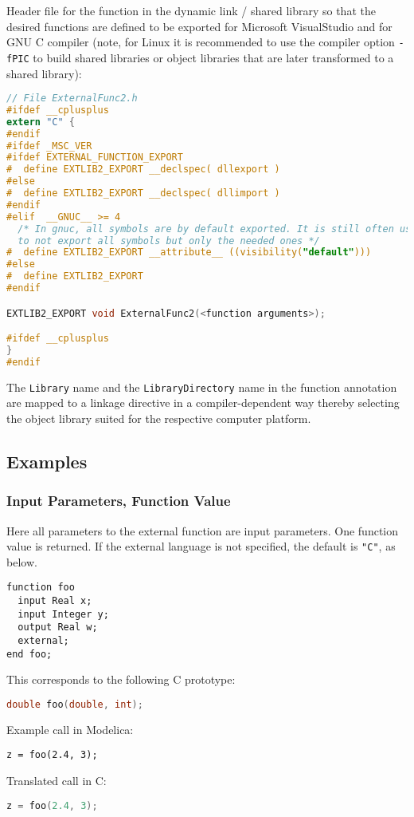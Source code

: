 \begin{example}
Header file for the function in the dynamic link / shared library
 so that the desired functions are defined to be exported
for Microsoft VisualStudio and for GNU C compiler (note, for Linux it is
recommended to use the compiler option \lstinline!-fPIC! to build shared
libraries or object libraries that are later transformed to a shared
library):
\begin{lstlisting}[language=C]
// File ExternalFunc2.h
#ifdef __cplusplus
extern "C" {
#endif
#ifdef _MSC_VER
#ifdef EXTERNAL_FUNCTION_EXPORT
#  define EXTLIB2_EXPORT __declspec( dllexport )
#else
#  define EXTLIB2_EXPORT __declspec( dllimport )
#endif
#elif  __GNUC__ >= 4
  /* In gnuc, all symbols are by default exported. It is still often useful,
  to not export all symbols but only the needed ones */
#  define EXTLIB2_EXPORT __attribute__ ((visibility("default")))
#else
#  define EXTLIB2_EXPORT
#endif

EXTLIB2_EXPORT void ExternalFunc2(<function arguments>);

#ifdef __cplusplus
}
#endif
\end{lstlisting}
\end{example}

The \lstinline!Library! name and the \lstinline!LibraryDirectory! name in the function annotation are mapped to a linkage directive in a compiler-dependent way thereby selecting the object library suited for the respective computer platform.

\subsection{Examples}\label{examples1}

\subsubsection{Input Parameters, Function Value}\label{input-parameters-function-value}

\begin{example}
Here all parameters to the external function are input
parameters. One function value is returned. If the external language is
not specified, the default is \lstinline!"C"!, as below.
\begin{lstlisting}[language=modelica]
function foo
  input Real x;
  input Integer y;
  output Real w;
  external;
end foo;
\end{lstlisting}
This corresponds to the following C prototype:
\begin{lstlisting}[language=C]
double foo(double, int);
\end{lstlisting}

Example call in Modelica:
\begin{lstlisting}[language=modelica]
z = foo(2.4, 3);
\end{lstlisting}
Translated call in C:
\begin{lstlisting}[language=C]
z = foo(2.4, 3);
\end{lstlisting}
\end{example}

